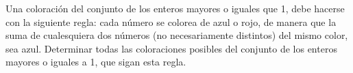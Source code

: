 Una coloración del conjunto de los enteros mayores o iguales que 1, debe hacerse con la siguiente regla: cada número se colorea de azul o rojo, de manera que la suma de cualesquiera dos números (no necesariamente distintos) del mismo color, sea azul. Determinar todas las coloraciones posibles del conjunto de los enteros mayores o iguales a 1, que sigan esta regla.